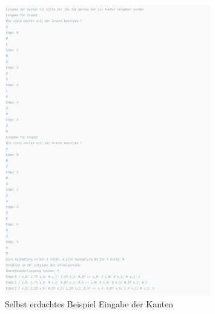 \documentclass[12pt]{article}
\begin{document}
\begin{figure}[h]
	\center
	\includegraphics[width=0.8\textwidth]{edge.png}
	\caption{Selbst erdachtes Beispiel Eingabe der Kanten}
\end{figure}
\end{document}
